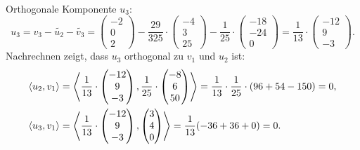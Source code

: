 \documentclass[german,12pt]{homework}
\newcommand{\dotproduct}[2]{\left\langle#1, #2\right\rangle}
\DeclarePairedDelimiter{\enbrace}{(}{)}
\begin{document}
\begin{enumerate}
\begin{align*}
        \end{align*}
        Orthogonale Komponente \(u_3\):
        \[u_3 = v_3 - \tilde{u_2} - \tilde{v_3} = \begin{pmatrix}-2\\0\\2\end{pmatrix} - \frac{29}{325} \cdot \begin{pmatrix}-4\\3\\25\end{pmatrix} - \frac{1}{25} \cdot \begin{pmatrix}-18\\-24\\0\end{pmatrix} = \frac{1}{13} \cdot \begin{pmatrix}-12\\9\\-3\end{pmatrix}.\]
        Nachrechnen zeigt, dass \(u_3\) orthogonal zu \(v_1\) und \(u_2\) ist:
        \begin{align*}
            \dotproduct{u_2}{v_1} &= \dotproduct{\frac{1}{13} \cdot \begin{pmatrix}-12\\9\\-3\end{pmatrix}}{\frac{1}{25} \cdot \begin{pmatrix}-8\\6\\50\end{pmatrix}} = \frac{1}{13} \cdot \frac{1}{25} \cdot \enbrace*{96 + 54 - 150} = 0,\\
            \dotproduct{u_3}{v_1} &= \dotproduct{\frac{1}{13} \cdot \begin{pmatrix}-12\\9\\-3\end{pmatrix}}{\begin{pmatrix}3\\4\\0\end{pmatrix}} = \frac{1}{13}\enbrace*{-36 + 36 + 0} = 0.
        \end{align*}
    \end{enumerate}
\end{document}
